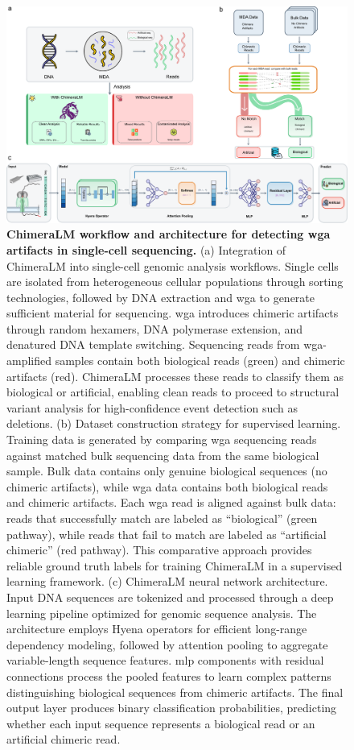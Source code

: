 \documentclass[pdflatex,sn-nature]{sn-jnl}%
\theoremstyle{thmstyleone}%
\theoremstyle{thmstyletwo}%
\theoremstyle{thmstylethree}%
\begin{document}
\begin{figure}[!ht]
	\begin{center}
		\includegraphics[width=\textwidth]{final_figures/figure1}
	\end{center}
	\caption{{\bf ChimeraLM workflow and architecture for detecting \gls{wga} artifacts in single-cell sequencing.}
		(a) Integration of ChimeraLM into single-cell genomic analysis workflows. Single cells are isolated from heterogeneous cellular populations through sorting technologies, followed by DNA extraction and \gls{wga} to generate sufficient material for sequencing. \gls{wga} introduces chimeric artifacts through random hexamers, DNA polymerase extension, and denatured DNA template switching. Sequencing reads from \gls{wga}-amplified samples contain both biological reads (green) and chimeric artifacts (red). ChimeraLM processes these reads to classify them as biological or artificial, enabling clean reads to proceed to structural variant analysis for high-confidence event detection such as deletions.
		(b) Dataset construction strategy for supervised learning. Training data is generated by comparing \gls{wga} sequencing reads against matched bulk sequencing data from the same biological sample. Bulk data contains only genuine biological sequences (no chimeric artifacts), while \gls{wga} data contains both biological reads and chimeric artifacts. Each \gls{wga} read is aligned against bulk data: reads that successfully match are labeled as ``biological'' (green pathway), while reads that fail to match are labeled as ``artificial chimeric'' (red pathway). This comparative approach provides reliable ground truth labels for training ChimeraLM in a supervised learning framework.
		(c) ChimeraLM neural network architecture. Input DNA sequences are tokenized and processed through a deep learning pipeline optimized for genomic sequence analysis. The architecture employs Hyena operators for efficient long-range dependency modeling, followed by attention pooling to aggregate variable-length sequence features. \gls{mlp} components with residual connections process the pooled features to learn complex patterns distinguishing biological sequences from chimeric artifacts. The final output layer produces binary classification probabilities, predicting whether each input sequence represents a biological read or an artificial chimeric read.} \label{fig:figure1}
\end{figure}
\end{document}
